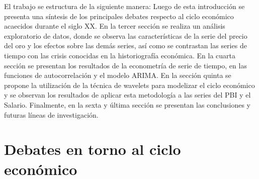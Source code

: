 \documentclass[a4paper]{article}
\begin{document}
El trabajo se estructura de la siguiente manera: Luego de esta introducción se presenta una síntesis de los principales debates respecto al ciclo económico acaecidos durante el siglo XX. En la tercer sección se realiza un análisis exploratorio de datos, donde se observa las características de la serie del precio del oro y los efectos sobre las demás series, así como se contrastan las series de tiempo con las crisis conocidas en la historiografía económica. En la cuarta sección se presentan los resultados de la econometría de serie de tiempo, en las funciones de autocorrelación y el modelo ARIMA. En la sección quinta se propone la utilización de la técnica de wavelets para modelizar el ciclo económico y se observan los resultados de aplicar esta metodología a las series del PBI y el Salario. Finalmente, en la sexta y última sección se presentan las conclusiones y futuras líneas de investigación.


\section{Debates en torno al ciclo económico}
\end{document}
